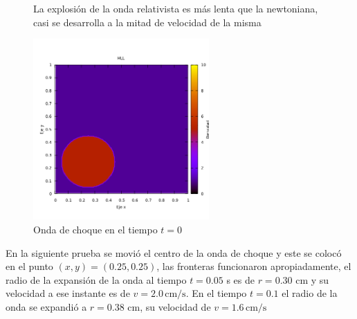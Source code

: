 \documentclass[12pt,a4paper]{book}
\begin{document}
\begin{figure}[H]
\caption{La explosión de la onda relativista es más lenta que la newtoniana, casi se desarrolla a la mitad de velocidad de la misma} \label{fig:HLL-prueba1}
\end{figure}

\begin{figure}[H]
\centering
\includegraphics[width=0.6\textwidth]{./Figuras/Pruebas/Prueba_onda_choque/onda_choque4_t_0}
\caption{Onda de choque en el tiempo $t = 0$} \label{fig:onda_choque4_t_0}
\end{figure}

En la siguiente prueba se movió el centro de la onda de choque y este se colocó en el punto $(x,y) = (0.25,0.25)$, las fronteras funcionaron apropiadamente, el radio de la expansión de la onda al tiempo $t=0.05$ s es de $r = 0.30$ cm y su velocidad a ese instante es de $v = 2.0 \, \mathrm{cm}/\mathrm{s}$. En el tiempo $t = 0.1$  el radio de la onda se expandió a $r = 0.38$ cm, su velocidad de $v = 1.6 \, \mathrm{cm}/\mathrm{s}$
\end{document}
